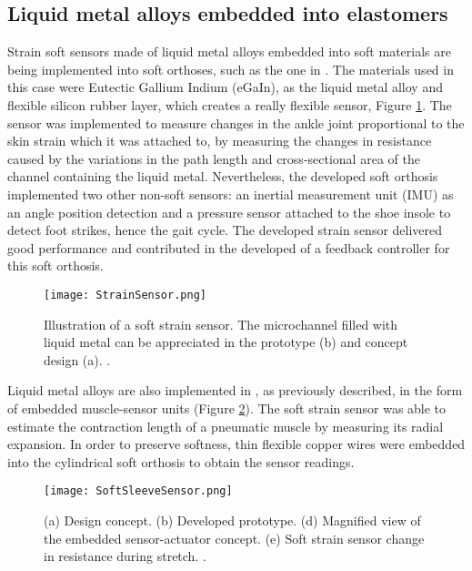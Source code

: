 \subsection{Liquid metal alloys embedded into elastomers}

Strain soft sensors made of liquid metal alloys embedded into soft materials are being implemented into soft orthoses, such as the one in \cite{Park2012a}. The materials used in this case were Eutectic Gallium Indium (eGaIn), as the liquid metal alloy and flexible silicon rubber layer, which creates a really flexible sensor, Figure \ref{fig:strain_sensor}. The sensor was implemented to measure changes in the ankle joint proportional to the skin strain which it was attached to, by measuring the changes in resistance caused by the variations in the path length and cross-sectional area of the channel containing the liquid metal. Nevertheless, the developed soft orthosis implemented two other non-soft sensors: an inertial measurement unit (IMU) as an angle position detection and a pressure sensor attached to the shoe insole to detect foot strikes, hence the gait cycle. The developed strain sensor delivered good performance and contributed in the developed of a feedback controller for this soft orthosis.

\begin{figure}[hb!]
    \centering
    \texttt{[image: StrainSensor.png]}
    \caption{Illustration of a soft strain sensor. The microchannel filled with liquid metal can be appreciated in the prototype (b) and concept design (a). \cite{Park2012a}. }
    \label{fig:strain_sensor}
\end{figure}

Liquid metal alloys are also implemented in \cite{Park2012}, as previously described, in the form of embedded muscle-sensor units (Figure \ref{fig:soft_sleeve_sensor}). The soft strain sensor was able to estimate the contraction length of a pneumatic muscle by measuring its radial expansion. In order to preserve softness, thin flexible copper wires were embedded into the cylindrical soft orthosis to obtain the sensor readings.

\begin{figure}[hb!]
    \centering
    \texttt{[image: SoftSleeveSensor.png]}
    \caption{(a) Design concept. (b) Developed prototype. (d) Magnified view of the embedded sensor-actuator concept. (e) Soft strain sensor change in resistance during stretch. \cite{Park2012}. }
    \label{fig:soft_sleeve_sensor}
\end{figure}

